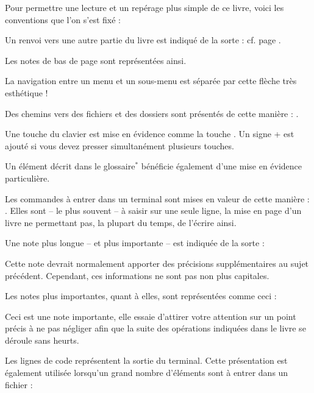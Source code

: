 \label{RefExemple}
Pour permettre une lecture et un repérage plus simple de ce livre, voici les conventions que l'on s'est fixé :\par
Un renvoi vers une autre partie du livre est indiqué de la sorte : cf. page \pageref{RefExemple}.\par
Les notes de bas de page sont représentées ainsi.\par
La navigation entre un menu et un sous-menu est séparée par cette flèche \FlecheDroite très esthétique !\par
Des chemins vers des fichiers et des dossiers sont présentés de cette manière : .\par
Une touche du clavier est mise en évidence comme la touche . Un signe + est ajouté si vous devez presser simultanément plusieurs touches.\par
Un élément décrit dans le glossaire$^*$ bénéficie également d'une mise en évidence particulière.\par
Les commandes à entrer dans un terminal sont mises en valeur de cette manière : . Elles sont -- le plus souvent -- à saisir sur une seule ligne, la mise en page d'un livre ne permettant pas, la plupart du temps, de l'écrire ainsi.\par
Une note plus longue -- et plus importante -- est indiquée de la sorte : \begin{nota}Cette note devrait normalement apporter des précisions supplémentaires au sujet précédent. Cependant, ces informations ne sont pas non plus capitales.\end{nota}\par
Les notes plus importantes, quant à elles, sont représentées comme ceci : \begin{attention}Ceci est une note importante, elle essaie d'attirer votre attention sur un point précis à ne pas négliger afin que la suite des opérations indiquées dans le livre se déroule sans heurts.\end{attention}\par
Les lignes de code représentent la sortie du terminal. Cette présentation est également utilisée lorsqu'un grand nombre d'éléments sont à entrer dans un fichier : \par
